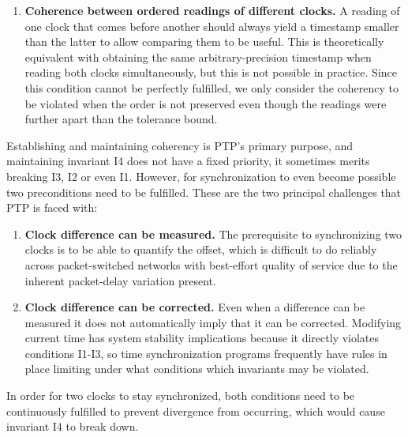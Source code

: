 \begin{enumerate}[label=I\arabic*.]
    \setcounter{enumi}{\value{errorConditions}}
    \item \textbf{Coherence between ordered readings of different clocks.} A reading of one clock that comes before another should always yield a timestamp smaller than the latter to allow comparing them to be useful. This is theoretically equivalent with obtaining the same arbitrary-precision timestamp when reading both clocks simultaneously, but this is not possible in practice. Since this condition cannot be perfectly fulfilled, we only consider the coherency to be violated when the order is not preserved even though the readings were further apart than the tolerance bound.
\end{enumerate}

Establishing and maintaining coherency is PTP's primary purpose, and maintaining invariant I4 does not have a fixed priority, it sometimes merits breaking I3, I2 or even I1. However, for synchronization to even become possible two preconditions need to be fulfilled. These are the two principal challenges that PTP is faced with:

\begin{enumerate}[label=P\arabic*.]

    \item \textbf{Clock difference can be measured.} The prerequisite to synchronizing two clocks is to be able to quantify the offset, which is difficult to do reliably across packet-switched networks with best-effort quality of service due to the inherent packet-delay variation present.
    \item \textbf{Clock difference can be corrected.} Even when a difference can be measured it does not automatically imply that it can be corrected. Modifying current time has system stability implications because it directly violates conditions I1-I3, so time synchronization programs frequently have rules in place limiting under what conditions which invariants may be violated.
\end{enumerate}

In order for two clocks to stay synchronized, both conditions need to be continuously fulfilled to prevent divergence from occurring, which would cause invariant I4 to break down.


